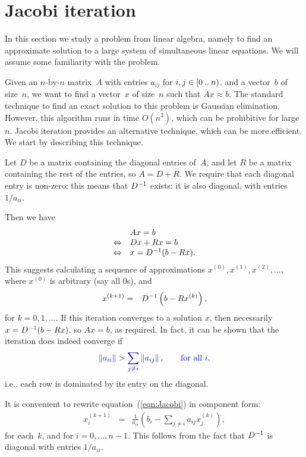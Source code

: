 \section{Jacobi iteration}

In this section we study a problem from linear algebra, namely to find an
approximate solution to a large system of simultaneous linear equations.  We
will assume some familiarity with the problem. 

Given an $n$-by-$n$ matrix~$A$ with entries $a_{ij}$ for $i,j \in
[0 \mathbin{..} n)$, and a vector~$b$ of size~$n$, we want to find a vector~$x$
of size~$n$ such that $Ax \approx b$.
%
The standard technique to find an exact solution to this problem is Gaussian
elimination.  However, this algorithm runs in time $O(n^3)$, which can be
prohibitive for large~$n$.  Jacobi iteration provides an alternative
technique, which can be more efficient.  We start by describing this
technique.

Let $D$ be a matrix containing the diagonal entries of~$A$, and let $R$ be a
matrix containing the rest of the entries, so $A = D+R$.  We require that each
diagonal entry is non-zero; this means that $D^{-1}$ exists: it is also
diagonal, with entries $1/a_{ii}$.

Then we have
\[
\begin{array}{cl}
& Ax = b \\
\Leftrightarrow & Dx + Rx = b \\
\Leftrightarrow & x = D^{-1} (b - Rx).
\end{array}
\]
This suggests calculating a sequence of approximations $x^{(0)}, x^{(1)},
x^{(2)}, \ldots$, where $x^{(0)}$ is arbitrary (say all $0$s), and
\begin{eqnarray}
x^{(k+1)} & = & D^{-1} \left( b-R x^{(k)} \right), \label{eqn:Jacobi}
\end{eqnarray}
for $k = 0,1,\ldots$.  If this iteration converges to a solution $x$, then
necessarily $x = D^{-1} (b - Rx)$, so $Ax = b$, as required.  In fact, it
can be shown that the iteration does indeed converge if
\[\mstyle
 \left \| a_{ii} \right \| > \sum_{j \ne i} \left \| a_{ij} \right \| ,
  \qquad \mbox{for all $i$}, 
\]
i.e., each row is dominated by its entry on the diagonal. 

It is convenient to rewrite equation~(\ref{eqn:Jacobi}) in component form:
\begin{eqnarray}
x^{(k+1)}_i & = & \frac{1}{a_{ii}} \left(b_i -\sum_{j\ne i} a_{ij} x^{(k)}_j\right),
\label{eqn:Jacobi-component}
\end{eqnarray}
for each~$k$, and for $i = 0,\ldots,n-1$.  This follows from the fact that
$D^{-1}$ is diagonal with entries  $1/a_{ii}$.

